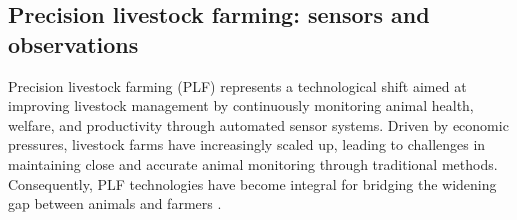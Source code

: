 



\subsection{Precision livestock farming: sensors and observations}





Precision livestock farming (PLF) represents a technological shift aimed at improving livestock management by continuously monitoring animal health, welfare, and productivity through automated sensor systems. Driven by economic pressures, livestock farms have increasingly scaled up, leading to challenges in maintaining close and accurate animal monitoring through traditional methods. Consequently, PLF technologies have become integral for bridging the widening gap between animals and farmers \cite{NORTON20193009}.

